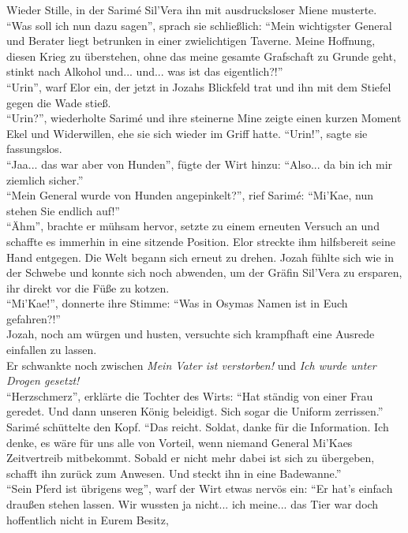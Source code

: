 Wieder Stille, in der Sarimé Sil'Vera ihn mit ausdrucksloser Miene musterte.\\
``Was soll ich nun dazu sagen'', sprach sie schließlich: ``Mein wichtigster General und Berater liegt 
betrunken in einer zwielichtigen Taverne. Meine Hoffnung, diesen Krieg zu überstehen, ohne das 
meine gesamte Grafschaft zu Grunde geht, stinkt nach Alkohol und... und... was ist das 
eigentlich?!''\\
``Urin'', warf Elor ein, der jetzt in Jozahs Blickfeld trat und ihn mit dem Stiefel gegen die Wade 
stieß.\\
``Urin?'', wiederholte Sarimé und ihre steinerne Mine zeigte einen kurzen Moment Ekel und 
Widerwillen, ehe sie sich wieder im Griff hatte. ``Urin!'', sagte sie fassungslos.\\
``Jaa... das war aber von Hunden'', fügte der Wirt hinzu: ``Also... da bin ich mir ziemlich
sicher.''\\
``Mein General wurde von Hunden angepinkelt?'', rief Sarimé: ``Mi'Kae, nun stehen Sie endlich 
auf!''\\
``Ähm'', brachte er mühsam hervor, setzte zu einem erneuten Versuch an und schaffte es immerhin in 
eine sitzende Position. Elor streckte ihm hilfsbereit seine Hand entgegen. Die Welt begann sich 
erneut zu drehen. Jozah fühlte sich wie in der Schwebe und konnte sich noch abwenden, um der Gräfin 
Sil'Vera zu ersparen, ihr direkt vor die Füße zu kotzen.\\
``Mi'Kae!'', donnerte ihre Stimme: ``Was in Osymas Namen ist in Euch gefahren?!''\\
Jozah, noch am würgen und husten, versuchte sich krampfhaft eine Ausrede einfallen zu lassen.\\
Er schwankte noch zwischen \textit{Mein Vater ist verstorben!} und \textit{Ich wurde unter Drogen 
gesetzt!}\\
``Herzschmerz'', erklärte die Tochter des Wirts: ``Hat ständig von einer Frau geredet. Und dann 
unseren König beleidigt. Sich sogar die Uniform zerrissen.''\\
Sarimé schüttelte den Kopf. ``Das reicht. Soldat, danke für die Information. Ich denke, es wäre für 
uns alle von Vorteil, wenn niemand General Mi'Kaes Zeitvertreib mitbekommt. Sobald er nicht mehr 
dabei ist sich zu übergeben, schafft ihn zurück zum Anwesen. Und steckt ihn in eine Badewanne.''\\
``Sein Pferd ist übrigens weg'', warf der Wirt etwas nervös ein: ``Er hat's einfach draußen stehen 
lassen. Wir wussten ja nicht... ich meine... das Tier war doch hoffentlich nicht in Eurem Besitz, 
